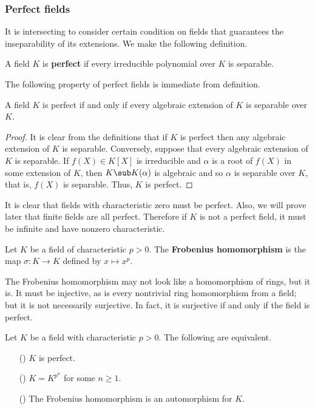 \subsubsection{Perfect fields}
It is intersecting to consider certain condition on fields that guarantees the inseparability of its extensions. We make the following definition.
\begin{definition}
A field $K$ is \textbf{perfect} if every irreducible polynomial over $K$ is separable.
\end{definition}
The following property of perfect fields is immediate from definition.
\begin{proposition}\label{field perfect iff algebraic ext is separable}
A field $K$ is perfect if and only if every algebraic extension of $K$ is separable over $K$.
\end{proposition}
\begin{proof}
It is clear from the definitions that if $K$ is perfect then any algebraic extension of $K$ is separable. Conversely, suppose that every algebraic extension of $K$ is separable. If $f(X)\in K[X]$ is irreducible and $\alpha$ is a root of $f(X)$ in some extension of $K$, then $K\sub K(\alpha)$ is algebraic and so $\alpha$ is separable over $K$, that is, $f(X)$ is separable. Thus, $K$ is perfect.
\end{proof}
It is clear that fields with characteristic zero must be perfect. Also, we will prove later that finite fields are all perfect. Therefore if $K$ is not a perfect field, it must be infinite and have nonzero characteristic.
\begin{definition}
Let $K$ be a field of characteristic $p>0$. The \textbf{Frobenius homomorphism} is the map $\sigma:K\to K$ defined by $x\mapsto x^p$.
\end{definition}
The Frobenius homomorphism may not look like a homomorphism of rings, but
it is. It must be injective, as is every nontrivial ring homomorphism
from a field; but it is not necessarily surjective. In fact, it is surjective if and only if the field is perfect.
\begin{proposition}\label{field perfect iff Frobenius}
Let $K$ be a field with characteristic $p>0$. The following are equivalent.
\begin{itemize}
\item[(\rmnum{1})] $K$ is perfect.
\item[(\rmnum{2})] $K=K^{p^n}$ for some $n\geq 1$. 
\item[(\rmnum{3})] The Frobenius homomorphism is an automorphism for $K$.
\end{itemize}
\end{proposition}

